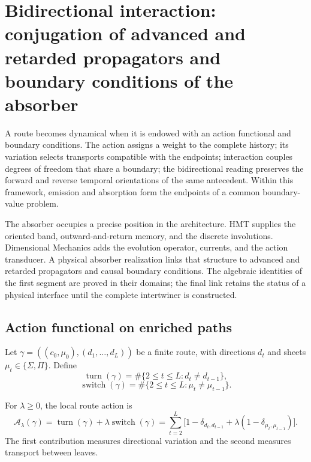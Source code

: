 \chapter{Bidirectional interaction: conjugation of advanced and retarded propagators and boundary conditions of the absorber}
\label{chap:mt-accion-interaccion-absorbedor}

A route becomes dynamical when it is endowed with an action functional and boundary conditions. The action assigns a weight to the complete history; its variation selects transports compatible with the endpoints; interaction couples degrees of freedom that share a boundary; the bidirectional reading preserves the forward and reverse temporal orientations of the same antecedent. Within this framework, emission and absorption form the endpoints of a common boundary-value problem.

The absorber occupies a precise position in the architecture. HMT supplies the
oriented band, outward-and-return memory, and the discrete involutions.
Dimensional Mechanics adds the evolution operator, currents, and the
action transducer. A physical absorber realization links that
structure to advanced and retarded propagators and causal boundary
conditions. The algebraic identities of the first segment are
proved in their domains; the final link retains the status of a
physical interface until the complete intertwiner is constructed.

\section{Action functional on enriched paths}

Let $\gamma=((c_0,\mu_0),(d_1,\ldots,d_L))$ be a finite route, with directions
$d_t$ and sheets $\mu_t\in\{\Sigma,\Pi\}$. Define
\[
 \operatorname{turn}(\gamma)
 =\#\{2\leq t\leq L:d_t\neq d_{t-1}\},
\]
\[
 \operatorname{switch}(\gamma)
 =\#\{2\leq t\leq L:\mu_t\neq\mu_{t-1}\}.
\]

\begin{definicionnarrativa}[title={Discrete Action of Minimal Interaction}]
\label{def:mt-accion-minima}
For $\lambda\geq0$, the local route action is
\begin{equation}
 \mathcal A_\lambda(\gamma)
 =\operatorname{turn}(\gamma)
 +\lambda\operatorname{switch}(\gamma)
 =\sum_{t=2}^{L}
 \bigl[1-\delta_{d_t,d_{t-1}}
 +\lambda(1-\delta_{\mu_t,\mu_{t-1}})\bigr].
 \label{eq:mt-accion-minima}
\end{equation}
The first contribution measures directional variation and the second measures transport between leaves.
\end{definicionnarrativa}

